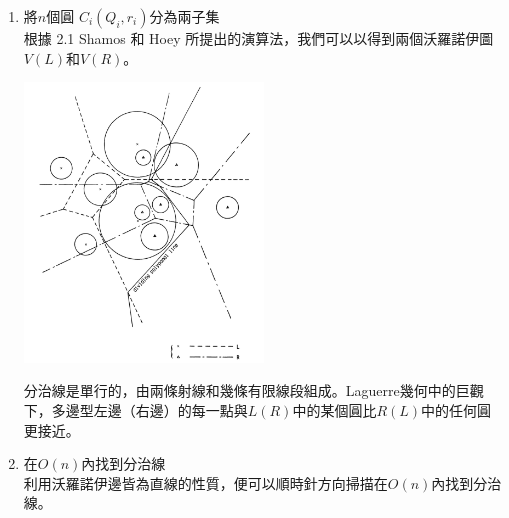 \documentclass[15pt]{extarticle}
\begin{document}
\begin{enumerate}
    \item 將$n$個圓 $C_i(Q_i,r_i)$分為兩子集 \\
        根據 2.1 Shamos 和 Hoey 所提出的演算法，我們可以以得到兩個沃羅諾伊圖$V(L)$和$V(R)$。
        \begin{center}
            \includegraphics[width=0.5\textwidth]{./img/fig4.png}
        \end{center}
    \begin{lemma}
        分治線是單行的，由兩條射線和幾條有限線段組成。Laguerre幾何中的巨觀下，多邊型左邊（右邊）的每一點與$L(R)$中的某個圓比$R(L)$中的任何圓更接近。
    \end{lemma}

    \item 在$O(n)$內找到分治線 \\
    利用沃羅諾伊邊皆為直線的性質，便可以順時針方向掃描在$O(n)$內找到分治線。


\end{enumerate}
\end{document}
